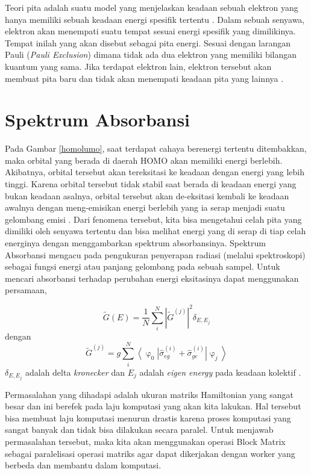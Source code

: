 \documentclass[12pt,a4paper]{report}
\newcommand{\bra}[1]{\ensuremath{\left\langle#1\right|}}
\newcommand{\ket}[1]{\ensuremath{\left|#1\right\rangle}}
\begin{document}
	Teori pita adalah suatu model yang menjelaskan keadaan sebuah elektron yang hanya memiliki sebuah keadaan energi spesifik tertentu \cite{Anil}. Dalam sebuah senyawa, elektron akan menempati suatu tempat sesuai energi spesifik yang dimilikinya. Tempat inilah yang akan disebut sebagai pita energi. Sesuai dengan larangan Pauli (\textit{Pauli Exclusion}) dimana tidak ada dua elektron yang memiliki bilangan kuantum yang sama. Jika terdapat elektron lain, elektron tersebut akan membuat pita baru dan tidak akan menempati keadaan pita yang lainnya \cite{Faizi2021}.
	
	\section{Spektrum Absorbansi}
	
	Pada Gambar \ref{homolumo}, saat terdapat cahaya berenergi tertentu ditembakkan, maka orbital yang berada di daerah HOMO akan memiliki energi berlebih. Akibatnya, orbital tersebut akan tereksitasi ke keadaan dengan energi yang lebih tinggi. Karena orbital tersebut tidak stabil saat berada di keadaan energi yang bukan keadaan asalnya, orbital tersebut akan de-eksitasi kembali ke keadaan awalnya dengan meng-emisikan energi berlebih yang ia serap menjadi suatu gelombang emisi \cite{Bird2002}. Dari fenomena tersebut, kita bisa mengetahui celah pita yang dimiliki oleh senyawa tertentu dan bisa melihat energi yang di serap di tiap celah energinya dengan menggambarkan spektrum absorbansinya. Spektrum Absorbansi mengacu pada pengukuran penyerapan radiasi (melalui spektroskopi) sebagai fungsi energi atau panjang gelombang pada sebuah sampel. Untuk mencari absorbansi terhadap perubahan energi eksitasinya dapat menggunakan persamaan,
	
	\begin{equation}
	\label{absorbansi}
	\tilde{G}(E) = \frac{1}{N} \sum\limits_{i}^N |\tilde{G}^{(j)}|^{2}\delta_{E,E_{j}}
	\end{equation}
	dengan
	\begin{equation}
		\tilde{G}^{(j)} = g\sum\limits_{i}^N \bra{\upvarphi_0}\hat{\sigma}_{eg}^{(i)}+\hat{\sigma}_{ge}^{(i)}\ket{\upvarphi_j}
	\end{equation}
	$\delta_{E,E_{j}}$ adalah delta \textit{kronecker} dan $E_{j}$ adalah \textit{eigen energy} pada keadaan kolektif \cite{Abdussalam2017}. 
	
	Permasalahan yang dihadapi adalah ukuran matriks Hamiltonian yang sangat besar dan ini berefek pada laju komputasi yang akan kita lakukan. Hal tersebut bisa membuat laju komputasi menurun drastis karena proses komputasi yang sangat banyak dan tidak bisa dilakukan secara paralel. Untuk menjawab permasalahan tersebut, maka kita akan menggunakan operasi Block Matrix sebagai paralelisasi operasi matriks agar dapat dikerjakan dengan worker yang berbeda dan membantu dalam komputasi.
	
\end{document}

